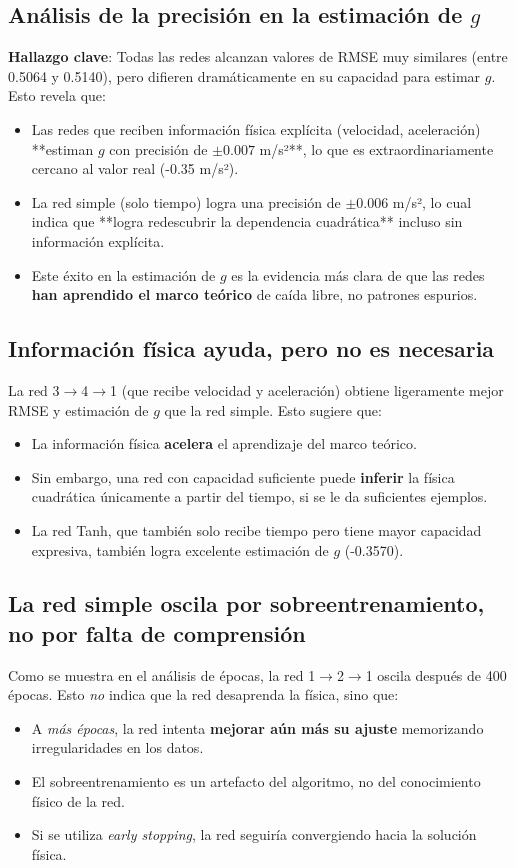 \documentclass[11pt]{article}
\begin{document}
\subsection{Análisis de la precisión en la estimación de $g$}
\textbf{Hallazgo clave}: Todas las redes alcanzan valores de RMSE muy similares (entre 0.5064 y 0.5140), pero difieren dramáticamente en su capacidad para estimar $g$. Esto revela que:

\begin{itemize}
    \item Las redes que reciben información física explícita (velocidad, aceleración) **estiman $g$ con precisión de $\pm 0.007$ m/s²**, lo que es extraordinariamente cercano al valor real (-0.35 m/s²).
    \item La red simple (solo tiempo) logra una precisión de $\pm 0.006$ m/s², lo cual indica que **logra redescubrir la dependencia cuadrática** incluso sin información explícita.
    \item Este éxito en la estimación de $g$ es la evidencia más clara de que las redes \textbf{han aprendido el marco teórico} de caída libre, no patrones espurios.
\end{itemize}

\subsection{Información física ayuda, pero no es necesaria}
La red 3$\rightarrow$4$\rightarrow$1 (que recibe velocidad y aceleración) obtiene ligeramente mejor RMSE y estimación de $g$ que la red simple. Esto sugiere que:
\begin{itemize}
    \item La información física \textbf{acelera} el aprendizaje del marco teórico.
    \item Sin embargo, una red con capacidad suficiente puede \textbf{inferir} la física cuadrática únicamente a partir del tiempo, si se le da suficientes ejemplos.
    \item La red Tanh, que también solo recibe tiempo pero tiene mayor capacidad expresiva, también logra excelente estimación de $g$ (-0.3570).
\end{itemize}

\subsection{La red simple oscila por sobreentrenamiento, no por falta de comprensión}
Como se muestra en el análisis de épocas, la red 1$\rightarrow$2$\rightarrow$1 oscila después de 400 épocas. Esto \textit{no} indica que la red desaprenda la física, sino que:
\begin{itemize}
    \item A \textit{más épocas}, la red intenta \textbf{mejorar aún más su ajuste} memorizando irregularidades en los datos.
    \item El sobreentrenamiento es un artefacto del algoritmo, no del conocimiento físico de la red.
    \item Si se utiliza \textit{early stopping}, la red seguiría convergiendo hacia la solución física.
\end{itemize}
\end{document}

